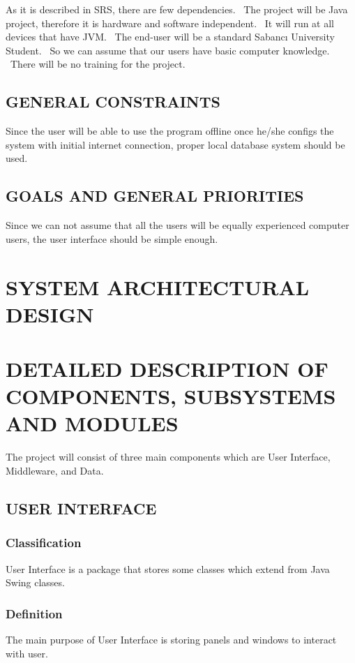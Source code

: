 \documentclass[twoside,letterpaper]{article}
\begin{document}
As it is described in SRS, there are few dependencies. \ The project will be Java project, therefore 
it is hardware and software independent. \  It will run at all devices that have JVM. \ The end-user 
will be a standard Sabanc\i{} University Student. \ So we can assume that our users have basic 
computer knowledge. \ There will be no training for the project. 

\subsection{GENERAL CONSTRAINTS}
Since the user will be able to use the program offline once he/she configs the system with initial internet connection, proper local database system should be used.



\subsection{GOALS AND GENERAL PRIORITIES}
Since we can not assume that all the users will be equally experienced computer users, the user interface should be simple enough. 


\clearpage\pagestyle{Standard}
\section{SYSTEM ARCHITECTURAL DESIGN}
\label{sec:architecture}



\clearpage\pagestyle{Standard}
\section{DETAILED DESCRIPTION OF COMPONENTS, SUBSYSTEMS AND MODULES}
\label{sec:description}

The project will consist of three main components which are User Interface, Middleware, and Data.

\subsection{USER INTERFACE}
\subsubsection{Classification}
User Interface is a package that stores some classes which extend from Java Swing classes. 
\subsubsection{Definition}
The main purpose of User Interface is storing panels and windows to interact with user.
\end{document}
